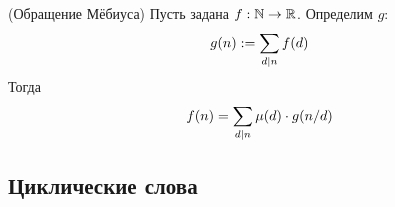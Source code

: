 \begin{theorem} (Обращение Мёбиуса)
	Пусть задана $f : \mathbb{N} \rightarrow \mathbb{R}$. Определим $g$:
	\[
		g(n) := \sum\limits_{d \mid n} f(d)
	\]
	Тогда
	\[
		f(n) = \sum\limits_{d \mid n} \mu(d) \cdot g(n / d)
	\]
\end{theorem}

\subsection{Циклические слова}